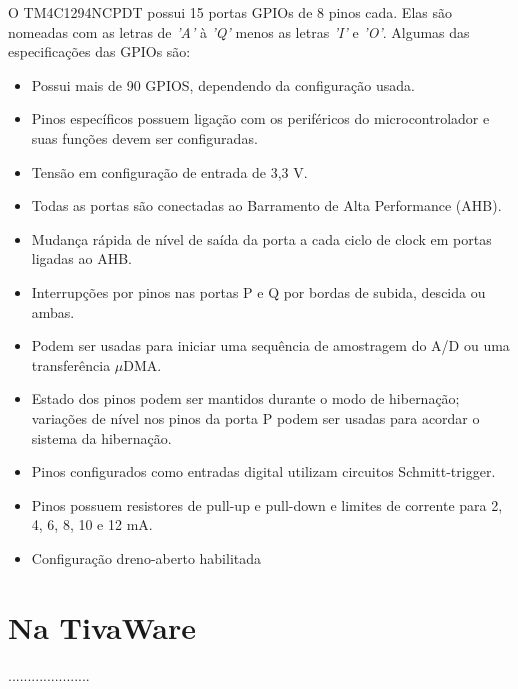 O TM4C1294NCPDT possui 15 portas GPIOs de 8 pinos cada. Elas são nomeadas com as letras de \emph{'A'} à \emph{'Q'} menos as letras \emph{'I'} e \emph{'O'}. Algumas das especificações das GPIOs são:

\begin{itemize}
	\item Possui mais de 90 GPIOS, dependendo da configuração usada.
	\item Pinos específicos possuem ligação com os periféricos do microcontrolador e suas funções devem ser configuradas.
	\item Tensão em configuração de entrada de 3,3 V.
	\item Todas as portas são conectadas ao Barramento de Alta Performance (AHB).
	\item Mudança rápida de nível de saída da porta a cada ciclo de clock em portas ligadas ao AHB.
	\item Interrupções por pinos nas portas P e Q por bordas de subida, descida ou ambas.
	\item Podem ser usadas para iniciar uma sequência de amostragem do A/D ou uma transferência $\mu$DMA.
	\item Estado dos pinos podem ser mantidos durante o modo de hibernação; variações de nível nos pinos da porta P podem ser usadas para acordar o sistema da hibernação.
	\item Pinos configurados como entradas digital utilizam circuitos Schmitt-trigger.
	\item Pinos possuem resistores de pull-up e pull-down e limites de corrente para 2, 4, 6, 8, 10 e 12 mA.
	\item Configuração dreno-aberto habilitada
\end{itemize}

\section{Na TivaWare}

.....................
\\\\\\\\\\\\\\\\\